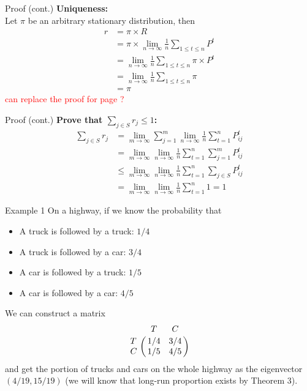 \documentclass[mathserif]{beamer}
\begin{document}
\begin{frame}{Proof (cont.)}
	\textbf{Uniqueness:} \\
	Let $\pi$ be an arbitrary stationary distribution, then
	\begin{align*}
	r &= \pi \times R \\
	&= \pi \times \lim_{n\to\infty} \frac{1}{n} \sum_{1 \leq t \leq n} P^t \\
	&= \lim_{n\to\infty} \frac{1}{n} \sum_{1 \leq t \leq n} \pi \times P^t \\
	&= \lim_{n\to\infty} \frac{1}{n} \sum_{1 \leq t \leq n} \pi \\
	&= \pi
	\end{align*}
	\textcolor{red}{can replace the proof for page \pageref{uniqueness}?}
\end{frame}

\begin{frame}{Proof (cont.)}\label{proportion_sum}
	\textbf{Prove that $\sum_{j \in S} r_j \leq 1$:}\\
	\begin{align*}
	\sum_{j \in S} r_j & = 
	\lim_{m\to\infty} \sum_{j=1}^m \lim_{n\to\infty} \frac{1}{n} \sum_{t=1}^n P^t_{ij} \\
	& = \lim_{m\to\infty} \lim_{n\to\infty} \frac{1}{n}\sum_{t=1}^n \sum_{j=1}^m P^t_{ij} \\
	& \leq \lim_{m\to\infty} \lim_{n\to\infty} \frac{1}{n}\sum_{t=1}^n \sum_{j\in S} P^t_{ij} \\
	& = \lim_{m\to\infty} \lim_{n\to\infty} \frac{1}{n}\sum_{t=1}^n 1 = 1
	\end{align*}
\end{frame}

\begin{frame}{Example 1}
	On a highway, if we know the probability that
	\begin{itemize}
	\item A truck is followed by a truck: $1/4$
	\item A truck is followed by a car: $3/4$
	\item A car is followed by a truck: $1/5$
	\item A car is followed by a car: $4/5$
	\end{itemize}
	We can construct a matrix
	\[
	\bordermatrix{~ & T   & C   \cr
                  T & 1/4 & 3/4 \cr
                  C & 1/5 & 4/5 \cr}
	\]
	and get the portion of trucks and cars on the whole highway as the eigenvector $(4/19, 15/19)$
	(we will know that long-run proportion exists by Theorem 3).
\end{frame}
\end{document}
